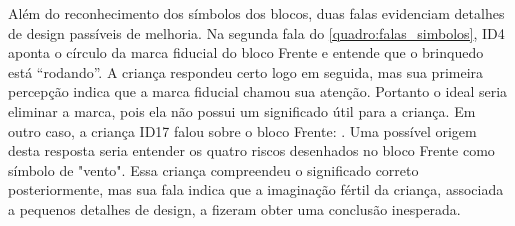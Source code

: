 Além do reconhecimento dos símbolos dos blocos, duas falas evidenciam detalhes de design passíveis de melhoria. Na segunda fala do \autoref{quadro:falas_simbolos}, ID4 aponta o círculo da marca fiducial do bloco Frente e entende que o brinquedo está “rodando”. A criança respondeu certo logo em seguida, mas sua primeira percepção indica que a marca fiducial chamou sua atenção. Portanto o ideal seria eliminar a marca, pois ela não possui um significado útil para a criança. Em outro caso, a criança ID17 falou sobre o bloco Frente: . Uma possível origem desta resposta seria entender os quatro riscos desenhados no bloco Frente como símbolo de "vento". Essa criança compreendeu o significado correto posteriormente, mas sua fala indica que a imaginação fértil da criança, associada a pequenos detalhes de design, a fizeram obter uma conclusão inesperada.

